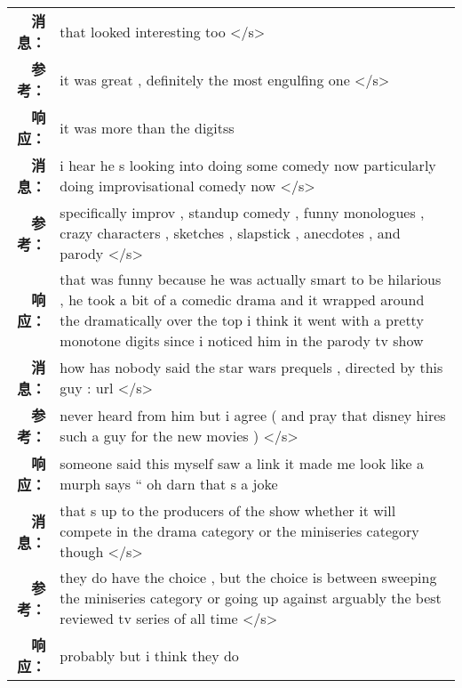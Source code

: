 \begin{tabularx}{\textwidth}{@{}rX@{}}
\midrule%
\textbf{消息：}&that looked interesting too </s>\\%
\textbf{参考：}&it was great , definitely the most engulfing one </s>\\%
\textbf{响应：}&it was more than the digitss\\%
\midrule%
\textbf{消息：}&i hear he s looking into doing some comedy now particularly doing improvisational comedy now </s>\\%
\textbf{参考：}&specifically improv , standup comedy , funny monologues , crazy characters , sketches , slapstick , anecdotes , and parody </s>\\%
\textbf{响应：}&that was funny because he was actually smart to be hilarious , he took a bit of a comedic drama and it wrapped around the dramatically over the top i think it went with a pretty monotone digits since i noticed him in the parody tv show\\%
\midrule%
\textbf{消息：}&how has nobody said the star wars prequels , directed by this guy : url </s>\\%
\textbf{参考：}&never heard from him but i agree ( and pray that disney hires such a guy for the new movies ) </s>\\%
\textbf{响应：}&someone said this myself saw a link it made me look like a murph says `` oh darn that s a joke\\%
\midrule%
\textbf{消息：}&that s up to the producers of the show whether it will compete in the drama category or the miniseries category though </s>\\%
\textbf{参考：}&they do have the choice , but the choice is between sweeping the miniseries category or going up against arguably the best reviewed tv series of all time </s>\\%
\textbf{响应：}&probably but i think they do\\%
\midrule\bottomrule%
%
\end{tabularx}